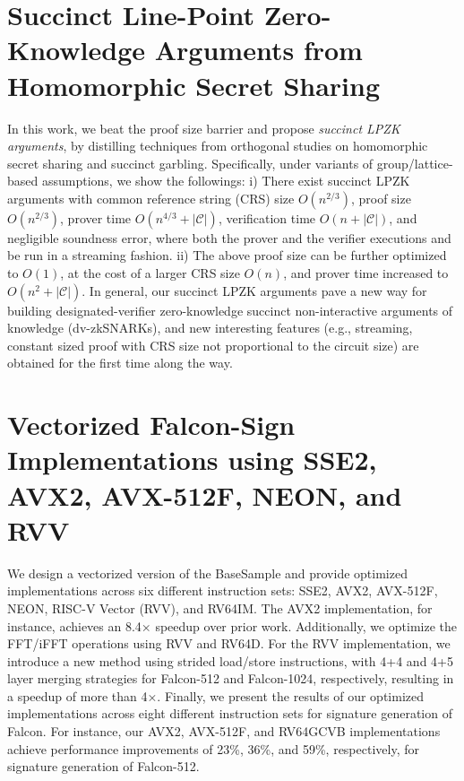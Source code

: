 \documentclass[11pt,oneside]{book}
\theoremstyle{definition}
\theoremstyle{remark}
\theoremstyle{plain}
\begin{document}
\section{\cite{cryptoeprint:2025/1866} Succinct Line-Point Zero-Knowledge Arguments from Homomorphic Secret Sharing}
In this work, we beat the proof size barrier and propose {\em succinct LPZK arguments}, by distilling techniques from orthogonal studies on homomorphic secret sharing and succinct garbling. Specifically, under variants of group/lattice-based assumptions, we show the followings: i) There exist succinct LPZK arguments with common reference string (CRS) size $O(n^{2/3})$, proof size $O(n^{2/3})$, prover time $O(n^{4/3}+|\mathcal{C}|)$, verification time $O(n+|\mathcal{C}|)$, and negligible soundness error, where both the prover and the verifier executions and be run in a streaming fashion. ii) The above proof size can be further optimized to $O(1)$, at the cost of a larger CRS size $O(n)$, and prover time increased to $O(n^{2}+|\mathcal{C}|)$. In general, our succinct LPZK arguments pave a new way for building designated-verifier zero-knowledge succinct non-interactive arguments of knowledge (dv-zkSNARKs), and new interesting features (e.g., streaming, constant sized proof with CRS size not proportional to the circuit size) are obtained for the first time along the way.

\section{\cite{cryptoeprint:2025/1867} Vectorized Falcon-Sign Implementations using SSE2, AVX2, AVX-512F, NEON, and RVV}
We design a vectorized version of the BaseSample and provide optimized implementations across six different instruction sets: SSE2, AVX2, AVX-512F, NEON, RISC-V Vector (RVV), and RV64IM. The AVX2 implementation, for instance, achieves an 8.4× speedup over prior work. Additionally, we optimize the FFT/iFFT operations using RVV and RV64D. For the RVV implementation, we introduce a new method using strided load/store instructions, with 4+4 and 4+5 layer merging strategies for Falcon-512 and Falcon-1024, respectively, resulting in a speedup of more than 4×.
Finally, we present the results of our optimized implementations across eight different instruction sets for signature generation of Falcon. For instance, our AVX2, AVX-512F, and RV64GCVB implementations achieve performance improvements of 23\%, 36\%, and 59\%, respectively, for signature generation of Falcon-512.
\end{document}
